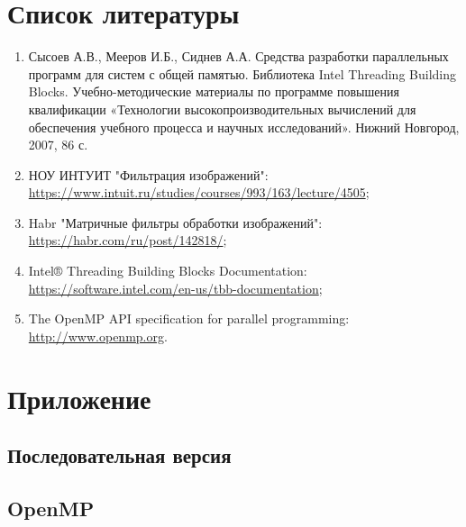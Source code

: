 \documentclass{report}
\begin{document}
	\section*{Список литературы}

	\begin{enumerate}
		\item Сысоев А.В., Мееров И.Б., Сиднев А.А. Средства разработки параллельных программ для систем с общей памятью. Библиотека Intel Threading Building Blocks. Учебно-методические материалы по программе повышения квалификации «Технологии высокопроизводительных вычислений для обеспечения учебного процесса и научных исследований». Нижний Новгород, 2007, 86 с.
		\item НОУ ИНТУИТ "Фильтрация изображений": \url{https://www.intuit.ru/studies/courses/993/163/lecture/4505};
		\item Habr "Матричные фильтры обработки изображений": \url{https://habr.com/ru/post/142818/};
		\item Intel® Threading Building Blocks Documentation: \url{https://software.intel.com/en-us/tbb-documentation};
		\item The OpenMP API specification for parallel programming: \url{http://www.openmp.org}.
	\end{enumerate}
	
	\newpage


	\section*{Приложение}

	\subsection*{Последовательная версия}
	
	
	

	\subsection*{OpenMP}
	
	
	
\end{document}
